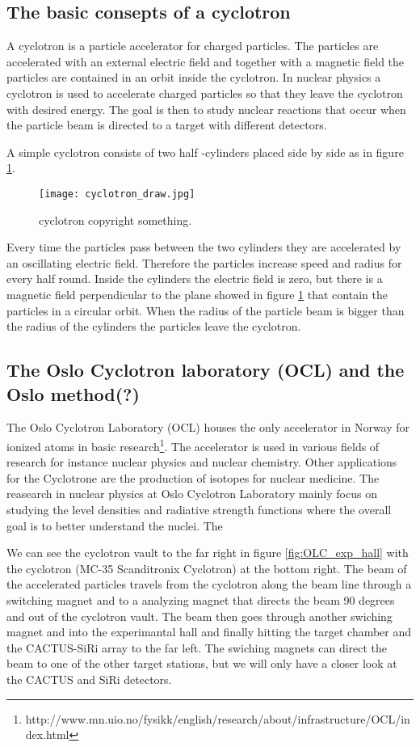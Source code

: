 \documentclass[11pt,a4wide]{article}
\begin{document}
\subsection{The basic consepts of a cyclotron}
A cyclotron is a particle accelerator for charged particles. The particles are accelerated with an external electric field and together with a magnetic field the particles are contained in an orbit inside the cyclotron. In nuclear physics a cyclotron is used to accelerate charged particles so that they leave the cyclotron with desired energy. The goal is then to study nuclear reactions that occur when the particle beam is directed to a target with different detectors. 

A simple cyclotron consists of two half -cylinders placed side by side as in figure \ref{fig:cyclotron_draw}.
\begin{figure}[htp]
\centering
\texttt{[image: cyclotron\_draw.jpg]}
\caption{cyclotron copyright something.}
\label{fig:cyclotron_draw}
\end{figure}
Every time the particles pass between the two cylinders they are accelerated by an oscillating electric field. Therefore the particles increase speed and radius for every half round. Inside the cylinders the electric field is zero, but there is a magnetic field perpendicular to the plane showed in figure \ref{fig:cyclotron_draw} that contain the particles in a circular orbit. When the radius of the particle beam is bigger than the radius of the cylinders the particles leave the cyclotron. 

\subsection{The Oslo Cyclotron laboratory (OCL) and the Oslo method(?)}
The Oslo Cyclotron Laboratory (OCL) houses the only accelerator in Norway for ionized atoms in basic research\footnote{http://www.mn.uio.no/fysikk/english/research/about/infrastructure/OCL/index.html}. The accelerator is used in various fields of research for instance nuclear physics and nuclear chemistry. Other applications for the Cyclotrone are the production of isotopes for nuclear medicine. The reasearch in nuclear physics at Oslo Cyclotron Laboratory mainly focus on studying the level densities and radiative strength functions where the overall goal is to better understand the nuclei. The 

We can see the cyclotron vault to the far right in figure \ref{fig:OLC_exp_hall} with the cyclotron (MC-35 Scanditronix Cyclotron) at the bottom right. The beam of the accelerated particles travels from the cyclotron along the beam line through a switching magnet and to a analyzing magnet that directs the beam 90 degrees and out of the cyclotron vault. The beam then goes through another swiching magnet and into the experimantal hall and finally hitting the target chamber and the CACTUS-SiRi array to the far left. The swiching magnets can direct the beam to one of the other target stations, but we will only have a closer look at the CACTUS and SiRi detectors. 
\end{document}
